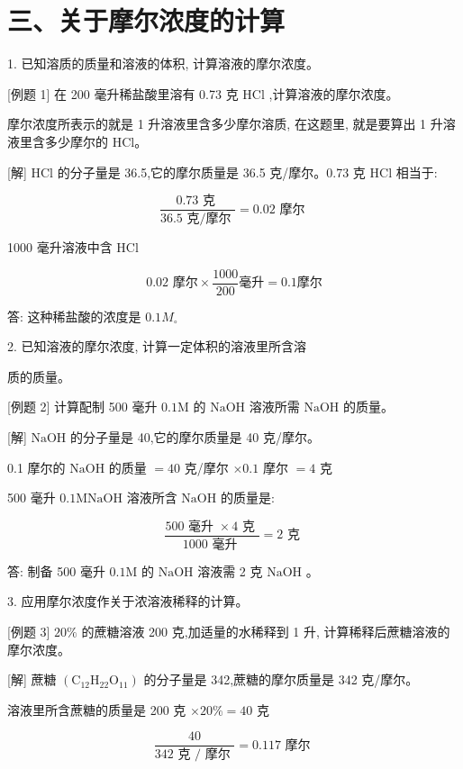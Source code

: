 \documentclass[10pt]{article}
\begin{document}
\section*{三、关于摩尔浓度的计算}

1. 已知溶质的质量和溶液的体积, 计算溶液的摩尔浓度。

[例题 1] 在 200 毫升稀盐酸里溶有 0.73 克 \(\mathrm{{HCl}}\) ,计算溶液的摩尔浓度。

摩尔浓度所表示的就是 1 升溶液里含多少摩尔溶质, 在这题里, 就是要算出 1 升溶液里含多少摩尔的 HCl。

[解] \(\mathrm{{HCl}}\) 的分子量是 36.5,它的摩尔质量是 36.5 克/摩尔。0.73 克 \(\mathrm{{HCl}}\) 相当于:

\[
\frac{{0.73}\text{ 克 }}{{36.5}\text{ 克/摩尔 }} = {0.02}\text{ 摩尔 }
\]

1000 毫升溶液中含 \(\mathrm{{HCl}}\)

\[
\text{0.02 摩尔} \times \frac{1000}{200}\text{毫升} = {0.1}\text{摩尔}
\]

答: 这种稀盐酸的浓度是 \({0.1}{M}_{ \circ }\)

2. 已知溶液的摩尔浓度, 计算一定体积的溶液里所含溶

质的质量。

[例题 2] 计算配制 500 毫升 \({0.1}\mathrm{M}\) 的 \(\mathrm{{NaOH}}\) 溶液所需 \(\mathrm{{NaOH}}\) 的质量。

[解] \(\mathrm{{NaOH}}\) 的分子量是 40,它的摩尔质量是 40 克/摩尔。

0.1 摩尔的 \(\mathrm{{NaOH}}\) 的质量 \(= {40}\) 克/摩尔 \(\times {0.1}\) 摩尔 \(= 4\) 克

500 毫升 \({0.1}\mathrm{M}\mathrm{{NaOH}}\) 溶液所含 \(\mathrm{{NaOH}}\) 的质量是:

\[
\frac{{500}\text{ 毫升 } \times 4\text{ 克 }}{{1000}\text{ 毫升 }} = 2\text{ 克 }
\]

答: 制备 500 毫升 \({0.1}\mathrm{M}\) 的 \(\mathrm{{NaOH}}\) 溶液需 2 克 \(\mathrm{{NaOH}}\) 。

3. 应用摩尔浓度作关于浓溶液稀释的计算。

[例题 3] \({20}\%\) 的蔗糖溶液 200 克,加适量的水稀释到 1 升, 计算稀释后蔗糖溶液的摩尔浓度。

[解] 蔗糖 \(\left( {{\mathrm{C}}_{12}{\mathrm{H}}_{22}{\mathrm{O}}_{11}}\right)\) 的分子量是 342,蔗糖的摩尔质量是 342 克/摩尔。

溶液里所含蔗糖的质量是 200 克 \(\times {20}\% = {40}\) 克

\[
\frac{40}{{342}\text{ 克 }/\text{ 摩尔 }} = {0.117}\text{ 摩尔 }
\]
\end{document}
